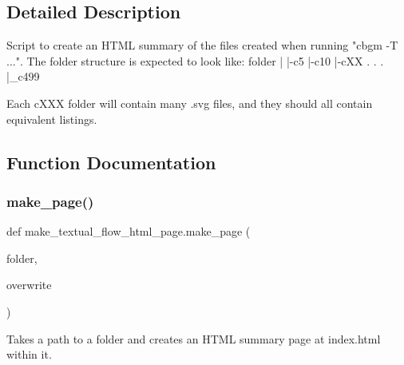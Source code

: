 \subsection{Detailed Description}
\begin{DoxyVerb}Script to create an HTML summary of the files created when running "cbgm -T ...". The folder structure
is expected to look like:
folder
 |
 |-c5
 |-c10
 |-cXX
 .
 .
 .
 |_c499

Each cXXX folder will contain many .svg files, and they should all contain equivalent listings.
\end{DoxyVerb}
 

\subsection{Function Documentation}
\mbox{\label{namespacemake__textual__flow__html__page_ac873252a13103c9454e02299b10d4b46}} 
\subsubsection{\texorpdfstring{make\+\_\+page()}{make\_page()}}
{\footnotesize\ttfamily def make\+\_\+textual\+\_\+flow\+\_\+html\+\_\+page.\+make\+\_\+page (\begin{DoxyParamCaption}\item[{}]{folder,  }\item[{}]{overwrite }\end{DoxyParamCaption})}

\begin{DoxyVerb}Takes a path to a folder and creates an HTML summary page at index.html within it.
\end{DoxyVerb}
 